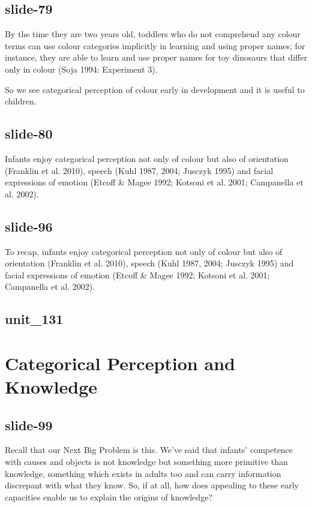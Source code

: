 \documentclass[12pt,\papersize]{extarticle}
\begin{document}
\subsection{slide-79}
By the time they are two years old, toddlers who do not comprehend any colour terms can use colour categories implicitly in learning and using proper names; for instance, they are able to learn and use proper names for toy dinosaurs that differ only in colour (Soja 1994: Experiment 3).

So we see categorical perception of colour early in development and it is useful to children.

\subsection{slide-80}
Infants enjoy categorical perception not only of colour but also of orientation (Franklin et al. 2010), speech (Kuhl 1987, 2004; Jusczyk 1995) and facial
expressions of emotion (Etcoff \& Magee 1992; Kotsoni et al. 2001; Campanella et al. 2002).

\subsection{slide-96}
To recap, infants enjoy categorical perception not only of colour but also of orientation (Franklin et al. 2010), speech (Kuhl 1987, 2004; Jusczyk 1995) and
facial expressions of emotion (Etcoff \& Magee 1992; Kotsoni et al. 2001; Campanella et al. 2002).

\subsection{unit\_131}


\section{Categorical Perception and Knowledge}

\subsection{slide-99}
Recall that our Next Big Problem is this.
We've said that infants' competence with causes and objects is not knowledge but something
more primitive than knowledge, something which exists in adults too and can carry information
discrepant with what they know. So, if at all, how does appealing to these early capacities
enable us to explain the origins of knowledge?
\end{document}
